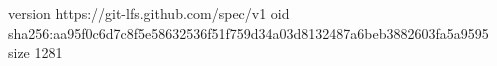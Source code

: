 version https://git-lfs.github.com/spec/v1
oid sha256:aa95f0c6d7c8f5e58632536f51f759d34a03d8132487a6beb3882603fa5a9595
size 1281
